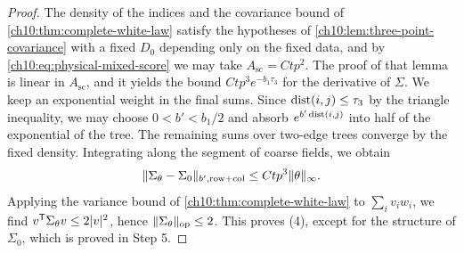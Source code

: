 \begin{proof}
The density of the indices and the covariance bound of \cref{ch10:thm:complete-white-law} satisfy the hypotheses of \cref{ch10:lem:three-point-covariance} with a fixed $D_0$ depending only on the fixed data, and by \eqref{ch10:eq:physical-mixed-score} we may take $A_{\mathrm{sc}}=Ctp^2$. The proof of that lemma is linear in $A_{\mathrm{sc}}$, and it yields the bound $Ctp^3e^{-b_1\tau_3}$ for the derivative of $\Sigma$. We keep an exponential weight in the final sums. Since $\operatorname{dist}(i,j)\le\tau_3$ by the triangle inequality, we may choose $0<b'<b_1/2$ and absorb $e^{b'\operatorname{dist}(i,j)}$ into half of the exponential of the tree. The remaining sums over two-edge trees converge by the fixed density. Integrating along the segment of coarse fields, we obtain
\begin{equation}\label{ch10:eq:weighted-covariance-response}
 \lVert \Sigma_\theta-\Sigma_0\rVert_{b',\mathrm{row+col}}\le Ctp^3\lVert \theta\rVert_\infty.
\end{equation}
Applying the variance bound of \cref{ch10:thm:complete-white-law} to $\sum_iv_iw_i$, we find $v^{\mathsf T}\Sigma_\theta v\le2\lvert v\rvert^2$, hence $\lVert \Sigma_\theta\rVert_{\mathrm{op}}\le2$. This proves (4), except for the structure of $\Sigma_0$, which is proved in Step 5.


\end{proof}
